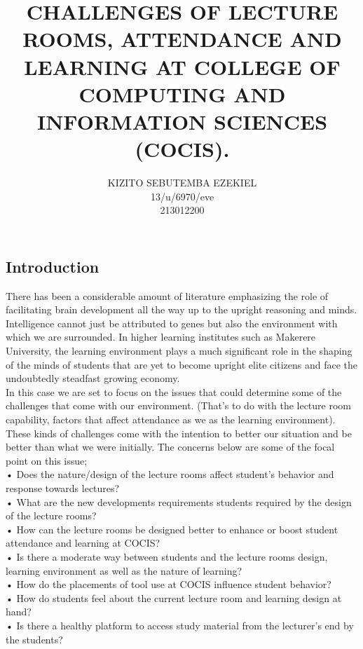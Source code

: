 \documentclass[10pt,a4paper]{report}
\author{KIZITO SEBUTEMBA EZEKIEL\\
13/u/6970/eve\\
213012200\\}
\title{CHALLENGES OF LECTURE ROOMS, ATTENDANCE AND LEARNING AT COLLEGE OF COMPUTING AND INFORMATION SCIENCES (COCIS).}
\begin{document}
	\begin{center}
		\subsection*{Introduction} 
	\end{center}
\begin{flushleft}
There has been a considerable amount of literature emphasizing the role of facilitating brain development all the way up to the upright reasoning and minds. Intelligence cannot just be attributed to genes but also the environment with which we are surrounded. In higher learning institutes such as Makerere University, the learning environment plays a much significant role in the shaping of the minds of students that are yet to become upright elite citizens and face the undoubtedly steadfast growing economy.\\
In this case we are set to focus on the issues that could determine some of the challenges that come with our environment. (That’s to do with the lecture room capability, factors that affect attendance as we as the learning environment).\\
These kinds of challenges come with the intention to better our situation and be better than what we were initially. The concerns below are some of the focal point on this issue;\\
•	Does the nature/design of the lecture rooms affect student’s behavior and response towards lectures?\\

•	What are the new developments requirements students required by the design of the lecture rooms?\\

•	How can the lecture rooms be designed better to enhance or boost student attendance and learning at COCIS?\\

•	Is there a moderate way between students and the lecture rooms design, learning environment as well as the nature of learning?\\

•	How do the placements of tool use at COCIS influence student behavior?\\

•	How do students feel about the current lecture room and learning design at hand?\\

•	Is there a healthy platform to access study material from the lecturer's end by the students?\\


\end{flushleft}
\end{document}
